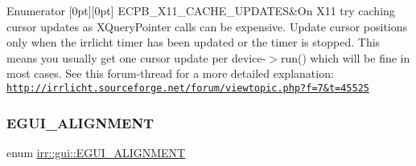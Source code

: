 \begin{DoxyEnumFields}{Enumerator}
[0pt][0pt]{}\mbox{\label{namespaceirr_1_1gui_abbd186f9cfba2f805d98248df226acefa368fcb0e1b11b1acaae73d44b482ba4a}} 
E\+C\+P\+B\+\_\+\+X11\+\_\+\+C\+A\+C\+H\+E\+\_\+\+U\+P\+D\+A\+T\+ES&On X11 try caching cursor updates as X\+Query\+Pointer calls can be expensive. Update cursor positions only when the irrlicht timer has been updated or the timer is stopped. This means you usually get one cursor update per device-\/$>$run() which will be fine in most cases. See this forum-\/thread for a more detailed explanation\+: \href{http://irrlicht.sourceforge.net/forum/viewtopic.php?f=7&t=45525}{\tt http\+://irrlicht.\+sourceforge.\+net/forum/viewtopic.\+php?f=7\&t=45525} \\
\hline

\end{DoxyEnumFields}
\mbox{\label{namespaceirr_1_1gui_a19eb5fb40e67f108cb16aba922ddaa2d}} 
\subsubsection{\texorpdfstring{E\+G\+U\+I\+\_\+\+A\+L\+I\+G\+N\+M\+E\+NT}{EGUI\_ALIGNMENT}\hspace{0.1cm}{\footnotesize\ttfamily [1/2]}}
{\footnotesize\ttfamily enum \hyperlink{namespaceirr_1_1gui_a19eb5fb40e67f108cb16aba922ddaa2d}{irr\+::gui\+::\+E\+G\+U\+I\+\_\+\+A\+L\+I\+G\+N\+M\+E\+NT}}

